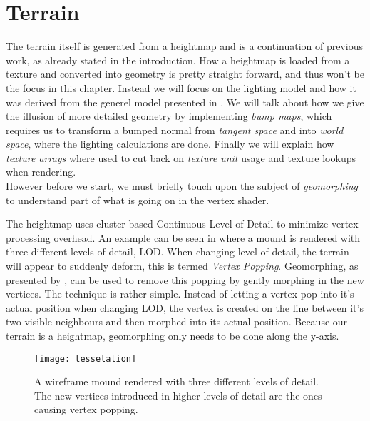 \chapter{Terrain}


The terrain itself is generated from a heightmap and is a continuation
of previous work, as already stated in the introduction. How a
heightmap is loaded from a texture and converted into geometry is
pretty straight forward, and thus won't be the focus in this
chapter. Instead we will focus on the lighting model and how it was
derived from the generel model presented in
. We will talk about how we give the illusion
of more detailed geometry by implementing \emph{bump maps}, which
requires us to transform a bumped normal from \emph{tangent space} and
into \emph{world space}, where the lighting calculations are
done. Finally we will explain how \emph{texture arrays} where used to
cut back on \emph{texture unit} usage and texture lookups when
rendering.\\


However before we start, we must briefly touch upon the subject of
\emph{geomorphing} to understand part of what is going on in the vertex
shader.


The heightmap uses cluster-based Continuous Level of Detail to
minimize vertex processing overhead. An example can be seen in
 where a mound is rendered with three
different levels of detail, LOD. When changing level of detail, the
terrain will appear to suddenly deform, this is termed \emph{Vertex
  Popping}. Geomorphing, as presented by , can be used
to remove this popping by gently morphing in the new vertices. The
technique is rather simple. Instead of letting a vertex pop into it's
actual position when changing LOD, the vertex is created on the line
between it's two visible neighbours and then morphed into its actual
position. Because our terrain is a heightmap, geomorphing only needs
to be done along the y-axis.

\begin{figure}
  \centering
  \texttt{[image: tesselation]}
  \caption{A wireframe mound rendered with three different levels of
    detail. The new vertices introduced in higher levels of detail are
    the ones causing vertex popping.}
  \label{fig:tesselation}
\end{figure}

